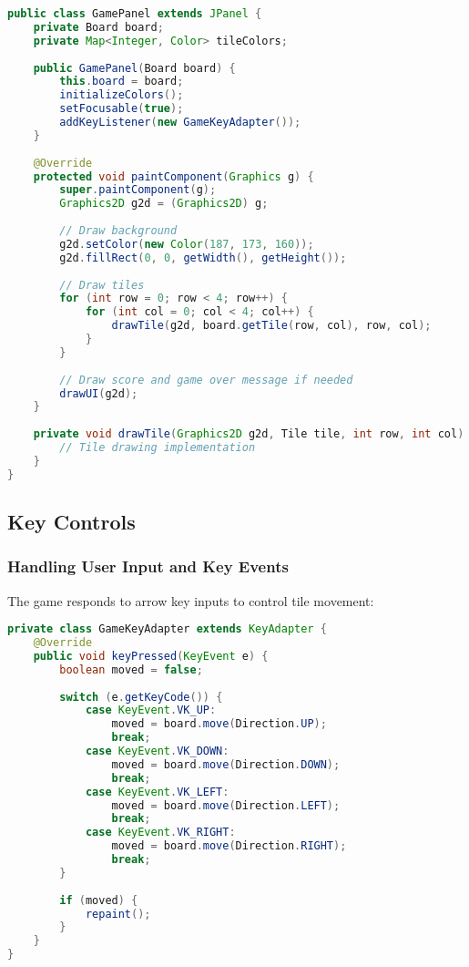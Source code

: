 \documentclass[12pt, a4paper]{article}
\begin{document}
\begin{lstlisting}[language=Java, caption=GamePanel Rendering]
public class GamePanel extends JPanel {
    private Board board;
    private Map<Integer, Color> tileColors;
    
    public GamePanel(Board board) {
        this.board = board;
        initializeColors();
        setFocusable(true);
        addKeyListener(new GameKeyAdapter());
    }
    
    @Override
    protected void paintComponent(Graphics g) {
        super.paintComponent(g);
        Graphics2D g2d = (Graphics2D) g;
        
        // Draw background
        g2d.setColor(new Color(187, 173, 160));
        g2d.fillRect(0, 0, getWidth(), getHeight());
        
        // Draw tiles
        for (int row = 0; row < 4; row++) {
            for (int col = 0; col < 4; col++) {
                drawTile(g2d, board.getTile(row, col), row, col);
            }
        }
        
        // Draw score and game over message if needed
        drawUI(g2d);
    }
    
    private void drawTile(Graphics2D g2d, Tile tile, int row, int col) {
        // Tile drawing implementation
    }
}
\end{lstlisting}

\subsection{Key Controls}

\subsubsection{Handling User Input and Key Events}
The game responds to arrow key inputs to control tile movement:

\begin{lstlisting}[language=Java, caption=Key Event Handling]
private class GameKeyAdapter extends KeyAdapter {
    @Override
    public void keyPressed(KeyEvent e) {
        boolean moved = false;
        
        switch (e.getKeyCode()) {
            case KeyEvent.VK_UP:
                moved = board.move(Direction.UP);
                break;
            case KeyEvent.VK_DOWN:
                moved = board.move(Direction.DOWN);
                break;
            case KeyEvent.VK_LEFT:
                moved = board.move(Direction.LEFT);
                break;
            case KeyEvent.VK_RIGHT:
                moved = board.move(Direction.RIGHT);
                break;
        }
        
        if (moved) {
            repaint();
        }
    }
}
\end{lstlisting}
\end{document}
